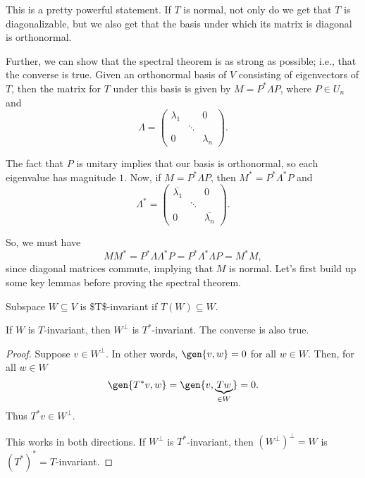 This is a pretty powerful statement. If $T$ is normal, not only do we get that $T$ is diagonalizable, but we also get that the basis under which its matrix is diagonal is orthonormal.

Further, we can show that the spectral theorem is as strong as possible; i.e., that the converse is true. Given an orthonormal basis of $V$ consisting of eigenvectors of $T$, then the matrix for $T$ under this basis is given by $M = P^*\Lambda P$, where $P\in U_n$ and 
\[\Lambda = \begin{pmatrix}
\lambda_1 &  & 0 \\
 & \ddots &  \\
0 &  & \lambda_n
\end{pmatrix}.\]

The fact that $P$ is unitary implies that our basis is orthonormal, so each eigenvalue has magnitude $1$. Now, if $M = P^*\Lambda P$, then $M^* = P^*\Lambda^*P$ and 
\[\Lambda^* = \begin{pmatrix}
\overline{\lambda_1} &  & 0 \\
 & \ddots &  \\
0 &  & \overline{\lambda_n}
\end{pmatrix}.\]

So, we must have 
\[MM^* = P^*\Lambda \Lambda^* P = P^* \Lambda^*\Lambda P = M^*M,\]
since diagonal matrices commute, implying that $M$ is normal. Let's first build up some key lemmas before proving the spectral theorem. 

\begin{definition}

Subspace $W\subseteq V$ is \ac{$T$-invariant} if $T(W)\subseteq W$.
\end{definition}

\begin{theorem}
\lemlabel

If $W$ is $T$-invariant, then $W^{\perp}$ is $T^*$-invariant. The converse is also true. 
\end{theorem}

\begin{proof}
Suppose $v\in W^{\perp}$. In other words, $\gen{v,w} = 0$ for all $w\in W$. Then, for all $w\in W$
\[\gen{T^*v, w} = \gen{v, \underbrace{Tw}_{\in W}} = 0.\]
Thus $T^*v\in W^{\perp}$. 

This works in both directions. If $W^{\perp}$ is $T^*$-invariant, then $(W^{\perp})^{\perp} = W$ is $(T^*)^* = T$-invariant.
\end{proof}

